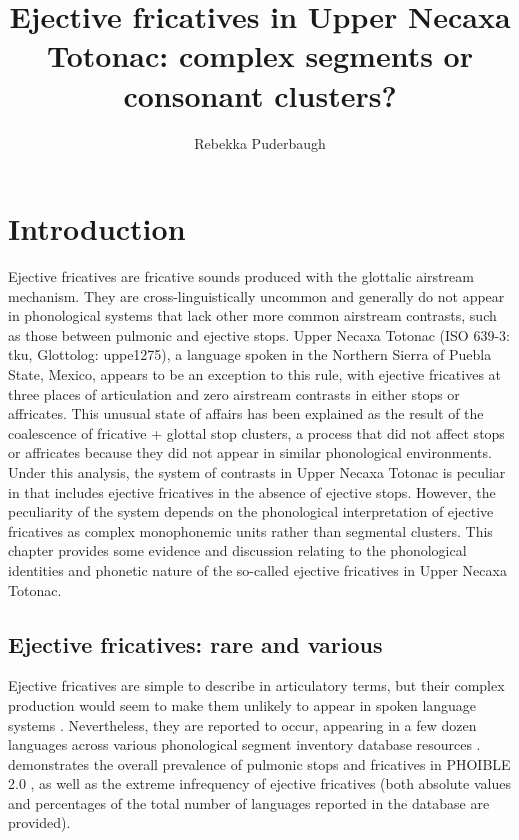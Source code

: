 \documentclass[output=paper,colorlinks,citecolor=brown]{langscibook}
\author{Rebekka Puderbaugh\orcid{0000-0003-2566-3604}\affiliation{University of Edinburgh}}
\title[Ejective fricatives in Upper Necaxa Totonac]{Ejective fricatives in Upper Necaxa Totonac: complex segments or consonant clusters?}
\begin{document}
\maketitle

\section{Introduction}
Ejective fricatives are fricative sounds produced with the glottalic airstream mechanism. They are cross-linguistically uncommon and generally do not appear in phonological systems that lack other more common airstream contrasts, such as those between pulmonic and ejective stops. Upper Necaxa Totonac (ISO 639-3: tku, Glottolog: uppe1275), a language spoken in the Northern Sierra of Puebla State, Mexico, appears to be an exception to this rule, with ejective fricatives at three places of articulation and zero airstream contrasts in either stops or affricates. This unusual state of affairs has been explained as the result of the coalescence of fricative + glottal stop clusters, a process that did not affect stops or affricates because they did not appear in similar phonological environments. Under this analysis, the system of contrasts in Upper Necaxa Totonac is peculiar in that includes ejective fricatives in the absence of ejective stops. However, the peculiarity of the system depends on the phonological interpretation of ejective fricatives as complex monophonemic units rather than segmental clusters. This chapter provides some evidence and discussion relating to the phonological identities and phonetic nature of the so-called ejective fricatives in Upper Necaxa Totonac.

\subsection{Ejective fricatives: rare and various}
Ejective fricatives are simple to describe in articulatory terms, but their complex production would seem to make them unlikely to appear in spoken language systems \citep{Maddieson2001a,Shosted2011}. Nevertheless, they are reported to occur, appearing in a few dozen languages across various phonological segment inventory database resources \citep{Maddieson1990,Shosted2011,Moran2019}.  demonstrates the overall prevalence of pulmonic stops and fricatives in PHOIBLE 2.0 \citep{Moran2019}, as well as the extreme infrequency of ejective fricatives (both absolute values and percentages of the total number of languages reported in the database are provided).
\end{document}
